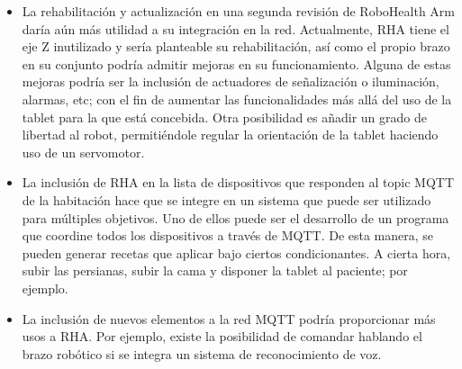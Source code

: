 \begin{itemize}
\item La rehabilitación y actualización en una segunda revisión de RoboHealth Arm daría aún más utilidad a su integración en la red. Actualmente, RHA tiene el eje Z inutilizado y sería planteable su rehabilitación, así como el propio brazo en su conjunto podría admitir mejoras en su funcionamiento. Alguna de estas mejoras podría ser la inclusión de actuadores de señalización o iluminación, alarmas, etc; con el fin de aumentar las funcionalidades más allá del uso de la tablet para la que está concebida. Otra posibilidad es añadir un grado de libertad al robot, permitiéndole regular la orientación de la tablet haciendo uso de un servomotor.

\item La inclusión de RHA en la lista de dispositivos que responden al topic MQTT de la habitación hace que se integre en un sistema que puede ser utilizado para múltiples objetivos. Uno de ellos puede ser el desarrollo de un programa que coordine todos los dispositivos a través de MQTT. De esta manera, se pueden generar recetas que aplicar bajo ciertos condicionantes. A cierta hora, subir las persianas, subir la cama y disponer la tablet al paciente; por ejemplo.

\item La inclusión de nuevos elementos a la red MQTT podría proporcionar más usos a RHA. Por ejemplo, existe la posibilidad de comandar hablando el brazo robótico si se integra un sistema de reconocimiento de voz.

\end{itemize}